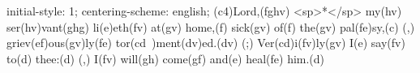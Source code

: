 initial-style: 1;
centering-scheme: english;
(c4)Lord,(fghv) <sp>*</sp> my(hv) ser(hv)vant(ghg) li(e)eth(fv) at(gv) home,(f) sick(gv) of(f) the(gv) pal(fe)sy,(c) (,) griev(ef)ous(gv)ly(fe) tor(cd~)ment(dv)ed.(dv) (;) Ver(cd)i(fv)ly(gv) I(e) say(fv) to(d) thee:(d) (,) I(fv) will(gh) come(gf) and(e) heal(fe) him.(d)
